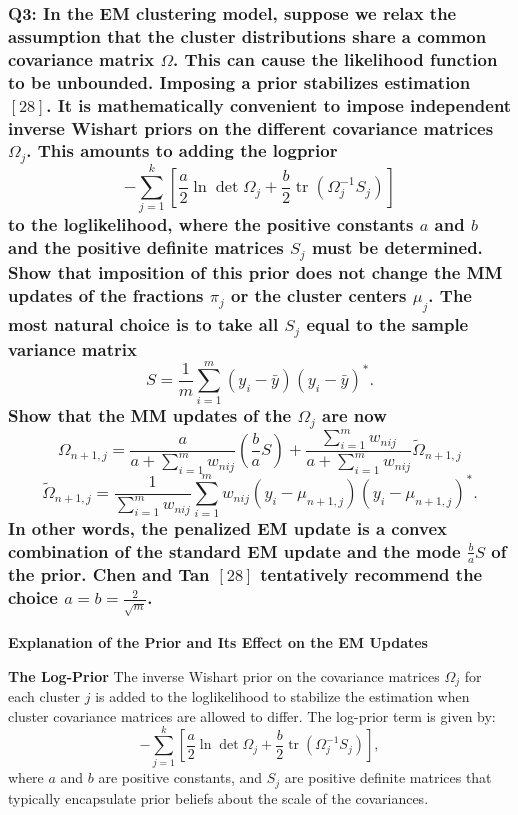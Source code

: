 \documentclass[8pt]{article}
\begin{document}
{\subsubsection*{Q3: In the EM clustering model, suppose we relax the assumption that the cluster distributions share a common covariance matrix \(\Omega\). This can cause the likelihood function to be unbounded. Imposing a prior stabilizes estimation \([28]\). It is mathematically convenient to impose independent inverse Wishart priors on the different covariance matrices \(\Omega_j\). This amounts to adding the logprior
\[
- \sum_{j=1}^{k} \left[ \frac{a}{2} \ln \det \Omega_j + \frac{b}{2} \operatorname{tr}(\Omega_j^{-1} S_j) \right]
\]
to the loglikelihood, where the positive constants \(a\) and \(b\) and the positive definite matrices \(S_j\) must be determined. Show that imposition of this prior does not change the MM updates of the fractions \(\pi_j\) or the cluster centers \(\mu_j\). The most natural choice is to take all \(S_j\) equal to the sample variance matrix
\[
S = \frac{1}{m} \sum_{i=1}^{m} (y_i - \bar{y})(y_i - \bar{y})^*.
\]
Show that the MM updates of the \(\Omega_j\) are now
\[
\Omega_{n+1,j} = \frac{a}{a + \sum_{i=1}^{m} w_{nij}} \left( \frac{b}{a} S \right) + \frac{\sum_{i=1}^{m} w_{nij}}{a + \sum_{i=1}^{m} w_{nij}} \tilde{\Omega}_{n+1,j}
\]
\[
\tilde{\Omega}_{n+1,j} = \frac{1}{\sum_{i=1}^{m} w_{nij}} \sum_{i=1}^{m} w_{nij} (y_i - \mu_{n+1,j})(y_i - \mu_{n+1,j})^*.
\]
In other words, the penalized EM update is a convex combination of the standard EM update and the mode \(\frac{b}{a} S\) of the prior. Chen and Tan \([28]\) tentatively recommend the choice \(a = b = \frac{2}{\sqrt{m}}\).}

\textbf{Explanation of the Prior and Its Effect on the EM Updates}

\textbf{The Log-Prior}
The inverse Wishart prior on the covariance matrices \(\Omega_j\) for each cluster \(j\) is added to the loglikelihood to stabilize the estimation when cluster covariance matrices are allowed to differ. The log-prior term is given by:
\[
- \sum_{j=1}^{k} \left[ \frac{a}{2} \ln \det \Omega_j + \frac{b}{2} \operatorname{tr}(\Omega_j^{-1} S_j) \right],
\]
where \(a\) and \(b\) are positive constants, and \(S_j\) are positive definite matrices that typically encapsulate prior beliefs about the scale of the covariances.

}
\end{document}
